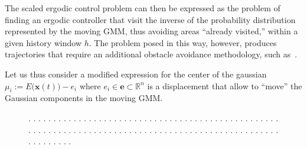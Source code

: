 \documentclass[letterpaper,10pt,conference,twoside]{IEEEtran}
\theoremstyle{definition}
\begin{document}
The scaled ergodic control problem can then be expressed as the problem of finding an ergodic controller that visit the inverse of the probability distribution represented by the moving GMM, thus avoiding areas ``already visited,'' within a given history window $h$. The problem posed in this way, however, produces trajectories that require an additional obstacle avoidance methodology, such as~\cite{lerch2023safety}.

Let us thus consider a modified expression for the center of the gaussian $\mu_i:=E\big(\mathbf{x}(t)\big)-e_i$ where $e_i\in\mathbf{e}\subset\mathbb{R}^n$ is a displacement that allow to ``move'' the Gaussian components in the moving GMM. 

\begin{figure}[t!]
  \begin{minipage}[t!]{.25\columnwidth}
    \caption[.]{\textbf{.   }.   .   .   .   .   .   .   .   .   .   .   .   .   .   .   .   .   .   .   .   .   .   .   .   .   .   .   .   .   .   .   .   .   .   .   .   .   .   .   .   .   .   .   .   .   .   .   .   .   .   .   .   .   .   .   .   .   .   .   .   .   .   .   .   .   .   .   .   .   .   .   .   .   .   .   .   .   .   .   .   .   .   .   .   .   .   .   .   .   .   .   .   .   .   .   .   .   .   .   .   .   .   .   .   .   .   .   .   .   .   .   .   .   .   .   .   .   .   .   .   .   .   .   .   .   .   .   .   .   .   .   .   .   .   .   .   .   .   .   .   .   .   .   .   .   .   .   .   .   .   .   .   .   .   .   .   .   .   .   .   .   .   .   .   .   .   .   .   .   .   .   .   .   .   .   .   .   .   .   .   .   .   .   .   .   .   .   .   .   .   .   .   .   .   .   .   .   .   .   .   .   .   .   .   .   .   .   .   .   .   .   .   .   .   .   .   .   .   .   .   .   .   .   .   .   .   .   .   .   .   .   .   .   .   .   .   .   .   .   .   .   .   .   .   .   .   .   .   .   .   .   .   .   .   .   .   .   . }
    \label{fig:0}
  \end{minipage}\hspace*{.3cm}
  \begin{minipage}[t!]{.7\columnwidth}
    \vspace*{-.3cm}
    
  \end{minipage}
  \vspace*{-.4cm}
  \caption*{\footnotesize .   .   .   .   .   .   .   .   .   .   .   .   .   .   .   .   .   .   .   .   .   .   .   .   .   .   .   .   .   .   .   .   .   .   .   .   .   .   .   .   .   .   .   .   .   .   .   .   .   .   .   .   .   .   .   .   .   .   .   .   .   .   .   .   .   .   .   .   .   .   .   .   .   .   .   .   .   .   .   .   .   .   .   .   .   .   .   .   .   .   .   .   .   .   .   .   .   .   .   .   .   .   .   .   .   .   .   .   .}
\end{figure}
\end{document}
